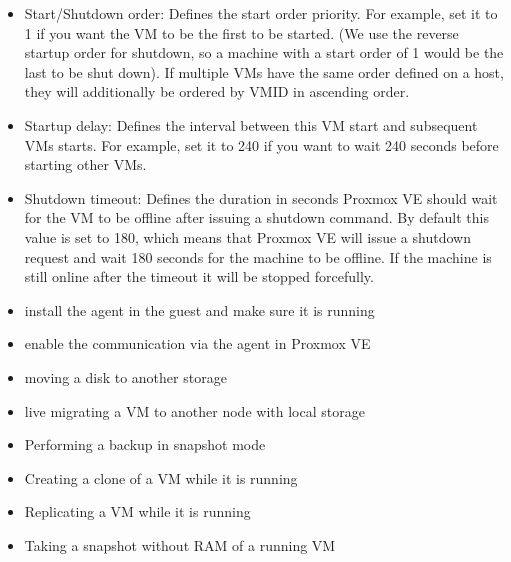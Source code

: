 \begin{itemize}[leftmargin=2cm]

	\item Start/Shutdown order: Defines the start order priority. For example, set it to 1 if you want the VM to be the first to be started. (We use the reverse startup order for shutdown, so a machine with a start order of 1 would be the last to be shut down). If multiple VMs have the same order defined on a host, they will additionally be ordered by VMID in ascending order.

	\item Startup delay: Defines the interval between this VM start and subsequent VMs starts. For example, set it to 240 if you want to wait 240 seconds before starting other VMs.

	\item Shutdown timeout: Defines the duration in seconds Proxmox VE should wait for the VM to be offline after issuing a shutdown command. By default this value is set to 180, which means that Proxmox VE will issue a shutdown request and wait 180 seconds for the machine to be offline. If the machine is still online after the timeout it will be stopped forcefully.

\end{itemize}

\begin{itemize}[leftmargin=2cm]

	\item install the agent in the guest and make sure it is running

	\item enable the communication via the agent in Proxmox VE

\end{itemize}

\begin{itemize}[leftmargin=2cm]

	\item moving a disk to another storage

	\item live migrating a VM to another node with local storage

\end{itemize}

\begin{itemize}[leftmargin=2cm]

	\item Performing a backup in snapshot mode

	\item Creating a clone of a VM while it is running

	\item Replicating a VM while it is running

	\item Taking a snapshot without RAM of a running VM

\end{itemize}

